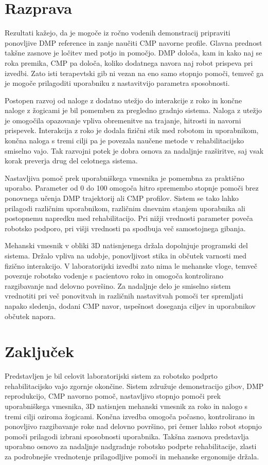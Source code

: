 \documentclass[a4paper]{article}
\begin{document}
\section{Razprava}

Rezultati kažejo, da je mogoče iz ročno vodenih demonstracij pripraviti
ponovljive DMP reference in zanje naučiti CMP navorne profile. Glavna prednost
takšne zasnove je ločitev med potjo in pomočjo. DMP določa, kam in kako naj se
roka premika, CMP pa določa, koliko dodatnega navora naj robot prispeva pri
izvedbi. Zato isti terapevtski gib ni vezan na eno samo stopnjo pomoči, temveč
ga je mogoče prilagoditi uporabniku z nastavitvijo parametra sposobnosti.

Postopen razvoj od naloge z dodatno utežjo do interakcije z roko in končne
naloge z žogicami je bil pomemben za pregledno gradnjo sistema. Naloga z utežjo
je omogočila opazovanje vpliva obremenitve na trajanje, hitrosti in navorni
prispevek. Interakcija z roko je dodala fizični stik med robotom in uporabnikom,
končna naloga s tremi cilji pa je povezala naučene metode v rehabilitacijsko
smiselno vajo. Tak razvojni potek je dobra osnova za nadaljnje razširitve, saj
vsak korak preverja drug del celotnega sistema.

Nastavljiva pomoč prek uporabniškega vmesnika je pomembna za praktično uporabo.
Parameter od 0 do 100 omogoča hitro spremembo stopnje pomoči brez ponovnega
učenja DMP trajektorij ali CMP profilov. Sistem se tako lahko prilagodi
različnim uporabnikom, različnim dnevnim stanjem uporabnika ali postopnemu
napredku med rehabilitacijo. Pri nižji vrednosti parameter poveča robotsko
podporo, pri višji vrednosti pa spodbuja več samostojnega gibanja.

Mehanski vmesnik v obliki 3D natisnjenega držala dopolnjuje programski del
sistema. Držalo vpliva na udobje, ponovljivost stika in občutek varnosti med
fizično interakcijo. V laboratorijski izvedbi zato nima le mehanske vloge,
temveč povezuje robotsko vodenje s pacientovo roko in omogoča kontrolirano
razgibavanje nad delovno površino. Za nadaljnje delo je smiselno sistem
vrednotiti pri več ponovitvah in različnih nastavitvah pomoči ter spremljati
napako sledenja, dodani CMP navor, uspešnost doseganja ciljev in uporabnikov
občutek napora.

\section{Zaključek}

Predstavljen je bil celovit laboratorijski sistem za robotsko podprto
rehabilitacijsko vajo zgornje okončine. Sistem združuje demonstracijo gibov,
DMP reprodukcijo, CMP navorno pomoč, nastavljivo stopnjo pomoči prek
uporabniškega vmesnika, 3D natisnjen mehanski vmesnik za roko in nalogo s tremi
cilji oziroma žogicami. Končna izvedba omogoča počasno, kontrolirano in
ponovljivo razgibavanje roke nad delovno površino, pri čemer lahko robot stopnjo
pomoči prilagodi izbrani sposobnosti uporabnika. Takšna zasnova predstavlja
uporabno osnovo za nadaljnje nadgradnje robotsko podprte rehabilitacije, zlasti
za podrobnejše vrednotenje prilagodljive pomoči in mehanske ergonomije držala.

\small


\end{document}

